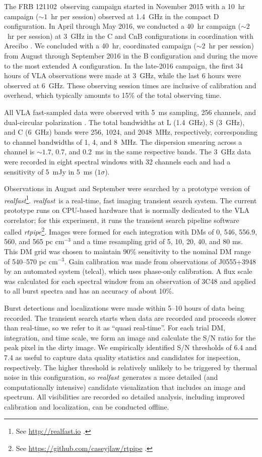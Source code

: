 \documentclass[twocolumn]{aastex61}
\newcommand{\rf}{\emph{realfast}}
\newcommand{\frb}{FRB 121102}
\begin{document}
The \frb\ observing campaign started in November 2015 with a 10~hr campaign ($\sim1$~hr per session) observed at 1.4~GHz in the compact D configuration. In April through May 2016, we conducted a 40~hr campaign ($\sim2$~hr per session) at 3~GHz in the C and CnB configurations in coordination with Arecibo \citep{2016arXiv160308880S}. We concluded with a 40~hr, coordinated campaign ($\sim2$~hr per session) from August through September 2016 in the B configuration and during the move to the most extended A configuration. In the late-2016 campaign, the first 34 hours of VLA observations were made at 3~GHz, while the last 6 hours were observed at 6~GHz. These observing session times are inclusive of calibration and overhead, which typically amounts to 15\% of the total observing time.

All VLA fast-sampled data were observed with 5~ms sampling, 256 channels, and dual-circular polarization \citep{2015ApJ...807...16L}. The total bandwidths at L (1.4~GHz), S (3~GHz), and C (6~GHz) bands were 256, 1024, and 2048~MHz, respectively, corresponding to channel bandwidths of  1, 4, and 8~MHz. The dispersion smearing across a channel is $\sim1.7$, 0.7, and 0.2~ms in the same respective bands. The 3~GHz data were recorded in eight spectral windows with 32 channels each and had a sensitivity of 5~mJy in 5~ms ($1\sigma$).

Observations in August and September were searched by a prototype version of \rf\footnote{See \url{http://realfast.io} \citep{2017AAS...22933002L}.}. \rf\ is a real-time, fast imaging transient search system. The current prototype runs on CPU-based hardware that is normally dedicated to the VLA correlator; for this experiment, it runs the transient search pipeline software called \emph{rtpipe}\footnote{See \url{https://github.com/caseyjlaw/rtpipe} \citep{2015ApJ...807...16L}.}. Images were formed for each integration with DMs of 0, 546, 556.9, 560, and 565 pc cm$^{-3}$ and a time resampling grid of 5, 10, 20, 40, and 80 ms. This DM grid was chosen to maintain 90\% sensitivity to the nominal DM range of 540--570 pc cm$^{-3}$. Gain calibration was made from observations of J0555+3948 by an automated system (telcal), which uses phase-only calibration. A flux scale was calculated for each spectral window from an observation of 3C48 and applied to all burst spectra and has an accuracy of about 10\%.

Burst detections and localizations were made within 5--10 hours of data being recorded. The transient search starts when data are recorded and proceeds slower than real-time, so we refer to it as ``quasi real-time''. For each trial DM, integration, and time scale, we form an image and calculate the S/N ratio for the peak pixel in the dirty image. We empirically identified S/N thresholds of 6.4 and 7.4 as useful to capture data quality statistics and candidates for inspection, respectively. The higher threshold is relatively unlikely to be triggered by thermal noise in this configuration, so \rf\ generates a more detailed (and computationally intensive) candidate visualization that includes an image and spectrum. All visibilities are recorded so detailed analysis, including improved calibration and localization, can be conducted offline. 
\end{document}
